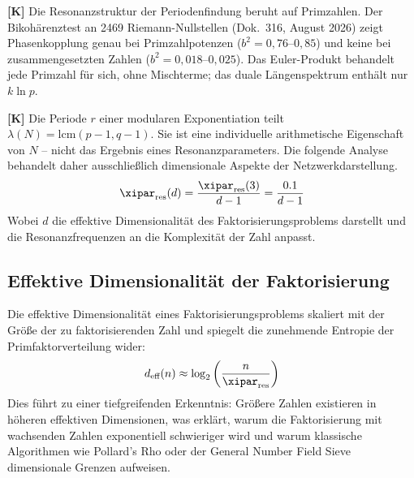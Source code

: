 \textbf{[K]} Die Resonanzstruktur der Periodenfindung beruht auf Primzahlen.
Der Bikohärenztest an 2469 Riemann-Nullstellen (Dok.~316, August 2026) zeigt
Phasenkopplung genau bei Primzahlpotenzen ($b^2 = 0{,}76$--$0{,}85$) und keine
bei zusammengesetzten Zahlen ($b^2 = 0{,}018$--$0{,}025$). Das Euler-Produkt
behandelt jede Primzahl für sich, ohne Mischterme; das duale Längenspektrum
enthält nur $k \ln p$.

\textbf{[K]} Die Periode $r$ einer modularen Exponentiation teilt
$\lambda(N) = \mathrm{lcm}(p-1, q-1)$. Sie ist eine individuelle arithmetische
Eigenschaft von $N$ -- nicht das Ergebnis eines Resonanzparameters. Die
folgende Analyse behandelt daher ausschließlich dimensionale Aspekte der
Netzwerkdarstellung.
\begin{equation}
	\xipar_{\text{res}}(d) = \frac{\xipar_{\text{res}}(3)}{d-1} = \frac{0.1}{d-1}
\end{equation}
Wobei $d$ die effektive Dimensionalität des Faktorisierungsproblems darstellt und die Resonanzfrequenzen an die Komplexität der Zahl anpasst.
\subsection{Effektive Dimensionalität der Faktorisierung}
\label{subsec:effective_dimensionality}
Die effektive Dimensionalität eines Faktorisierungsproblems skaliert mit der Größe der zu faktorisierenden Zahl und spiegelt die zunehmende Entropie der Primfaktorverteilung wider:
\begin{equation}
	d_{\text{eff}}(n) \approx \log_2\left(\frac{n}{\xipar_{\text{res}}}\right)
\end{equation}
Dies führt zu einer tiefgreifenden Erkenntnis: Größere Zahlen existieren in höheren effektiven Dimensionen, was erklärt, warum die Faktorisierung mit wachsenden Zahlen exponentiell schwieriger wird und warum klassische Algorithmen wie Pollard's Rho oder der General Number Field Sieve dimensionale Grenzen aufweisen.
\begin{table}[htbp]
	\centering
	\caption{Effektive Dimensionen und optimale Resonanzparameter, erweitert um RSA-Vergleiche}
	\label{tab:effective_dimensions}
\end{table}
